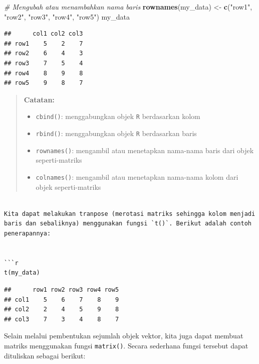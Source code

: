 \documentclass[
]{book}
\newenvironment{Shaded}{\begin{snugshade}}{\end{snugshade}}
\newcommand{\CommentTok}[1]{\textcolor[rgb]{0.56,0.35,0.01}{\textit{#1}}}
\newcommand{\FunctionTok}[1]{\textcolor[rgb]{0.13,0.29,0.53}{\textbf{#1}}}
\newcommand{\NormalTok}[1]{#1}
\newcommand{\OtherTok}[1]{\textcolor[rgb]{0.56,0.35,0.01}{#1}}
\newcommand{\StringTok}[1]{\textcolor[rgb]{0.31,0.60,0.02}{#1}}
\providecommand{\tightlist}{%
  \setlength{\itemsep}{0pt}\setlength{\parskip}{0pt}}
\theoremstyle{definition}
\theoremstyle{definition}
\theoremstyle{definition}
\theoremstyle{definition}
\theoremstyle{remark}
\begin{document}
\begin{Shaded}
\begin{Highlighting}[]
\CommentTok{\# Mengubah atau menambahkan nama baris}
\FunctionTok{rownames}\NormalTok{(my\_data) }\OtherTok{\textless{}{-}} \FunctionTok{c}\NormalTok{(}\StringTok{"row1"}\NormalTok{, }\StringTok{"row2"}\NormalTok{, }
                       \StringTok{"row3"}\NormalTok{, }\StringTok{"row4"}\NormalTok{, }
                       \StringTok{"row5"}\NormalTok{)}
\NormalTok{my\_data}
\end{Highlighting}
\end{Shaded}

\begin{verbatim}
##      col1 col2 col3
## row1    5    2    7
## row2    6    4    3
## row3    7    5    4
## row4    8    9    8
## row5    9    8    7
\end{verbatim}

\begin{quote}
\textbf{Catatan:}

\begin{itemize}
\tightlist
\item
  \texttt{cbind()}: menggabungkan objek \texttt{R} berdasarkan kolom
\item
  \texttt{rbind()}: menggabungkan objek \texttt{R} berdasarkan baris
\item
  \texttt{rownames()}: mengambil atau menetapkan nama-nama baris dari objek seperti-matriks
\item
  \texttt{colnames()}: mengambil atau menetapkan nama-nama kolom dari objek seperti-matriks
\end{itemize}
\end{quote}

\begin{verbatim}

Kita dapat melakukan tranpose (merotasi matriks sehingga kolom menjadi baris dan sebaliknya) menggunakan fungsi `t()`. Berikut adalah contoh penerapannya:


```r
t(my_data)
\end{verbatim}

\begin{verbatim}
##      row1 row2 row3 row4 row5
## col1    5    6    7    8    9
## col2    2    4    5    9    8
## col3    7    3    4    8    7
\end{verbatim}

Selain melalui pembentukan sejumlah objek vektor, kita juga dapat membuat matriks menggunakan fungsi \texttt{matrix()}. Secara sederhana fungsi tersebut dapat dituliskan sebagai berikut:
\end{document}
